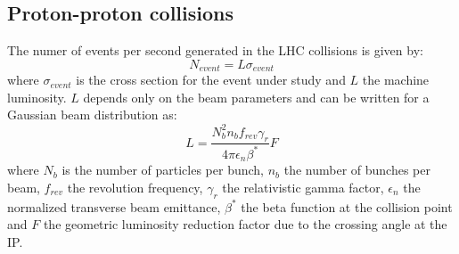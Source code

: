 \documentclass[a4paper, oneside]{book}
\begin{document}
			\subsection{Proton-proton collisions}
			The numer of events per second generated in the LHC collisions is given by:
			$$
			N_{event} = L\sigma_{event}
			$$
			where $\sigma_{event}$ is the cross section for the event under study and $L$ the machine luminosity. $L$ depends only on the beam parameters and can be written for a Gaussian beam distribution as: 
			$$
			L = \frac{N_b^2n_bf_{rev}\gamma_r}{4\pi\epsilon_n\beta^*}F
			$$
			\cite{LHC design} where $N_b$ is the number of particles per bunch, $n_b$ the number of bunches per beam, $f_{rev}$ the revolution frequency, $\gamma_r$ the relativistic gamma factor, $\epsilon_n$ the normalized transverse beam emittance, $\beta^*$ the beta function at the collision point and $F$ the geometric luminosity reduction factor due to the crossing angle at the IP.
			
\end{document}
